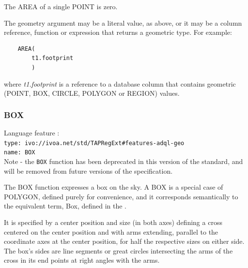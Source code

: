 \documentclass[11pt,a4paper]{ivoa}
\begin{document}
The AREA of a single POINT is zero.

The geometry argument may be a literal value, as above, or it may be a
column reference, function or expression that returns a geometric type.
For example:
\begin{verbatim}
    AREA(
        t1.footprint
        )
\end{verbatim}
where \textit{t1.footprint} is a reference to a database column that
contains geometric (POINT, BOX, CIRCLE, POLYGON or REGION) values.

\subsubsection{BOX}
\label{sec:functions.geom.box}
{\footnotesize Language feature :}\\
{\footnotesize \verb|type: ivo://ivoa.net/std/TAPRegExt#features-adql-geo|}\\
{\footnotesize \verb|name: BOX|}\\

Note - the \verb|BOX| function has been deprecated in this version of the standard,
and will be removed from future versions of the specification.

The BOX function expresses a box on the sky. A BOX is a special case of POLYGON,
defined purely for convenience,
and it corresponds semantically to the equivalent term, Box, defined in
the \STCSpec{}.

It is specified by a center position and size
(in both axes) defining a cross centered on the center position and
with arms extending, parallel to the coordinate axes at the center position,
for half the respective sizes on either side. The box’s sides are line
segments or great circles intersecting the arms of the cross in its end
points at right angles with the arms.


\end{document}
